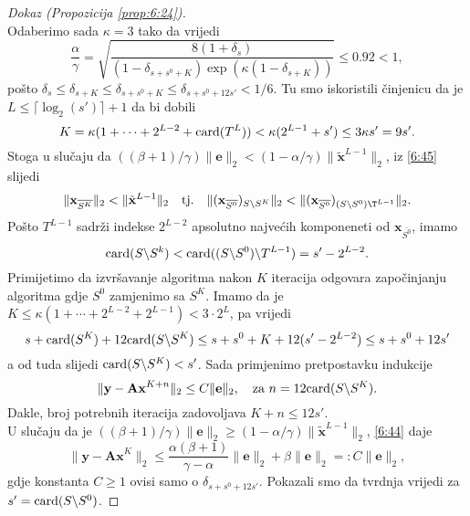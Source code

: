 \documentclass[a4paper,twoside,12pt]{memoir} %
\newcommand{\vect}[1]{\mathbf{#1}}
\renewcommand{\vec}{\vect}
\newcommand{\card}{\text{\normalfont{card}}}
\newcommand{\norm}[1]{\|{#1}\|}
\begin{document}
\begin{proof}[Dokaz (Propozicija \ref{prop:6:24})]
\begin{equation}
    \end{equation}
    Odaberimo sada $\kappa = 3$ tako da vrijedi
    \begin{equation*}
        \frac{\alpha}{\gamma} = \sqrt{\frac{8(1+\delta_s)}{(1-\delta_{s+s^0+K}) \exp(\kappa(1-\delta_{s+K}))}}  \leq 0.92 < 1,
    \end{equation*}
    po\v{s}to $\delta_s \leq \delta_{s+K} \leq \delta_{s+s^0+K} \leq \delta_{s+s^0+12s'} < 1/6$. Tu smo iskoristili \v{c}injenicu da je $L \leq \lceil \log_2(s') \rceil + 1$ da bi dobili
    \begin{equation*}
        K = \kappa(1+\cdots+2^{L-2} + \card(T^L)) < \kappa(2^{L-1}+s')\leq 3 \kappa s' = 9 s'.
    \end{equation*}
    Stoga u slu\v{c}aju da $((\beta+1)/\gamma)\norm{\vec e}_2 < (1- \alpha/\gamma) \norm{\tilde{\vec x}^{L-1}}_2$, iz \eqref{6:45} slijedi
    \begin{equation*}
        \norm{\vec x_{\overline{S^K}}}_2 < \norm{\tilde{\vec x}^{L-1}}_2 \quad \text{tj.} \quad \norm{(\vec x_{\overline{S^0}})_{S \backslash S^K}}_2 < \norm{(\vec x_{\overline{S^0}})_{(S \backslash S^0)\T^{L-1}}}_2.
    \end{equation*}
    Po\v{s}to $T^{L-1}$ sadr\v{z}i indekse $2^{L-2}$ apsolutno najve\'cih komponeneti od $\vec x_{\overline{S^0}}$, imamo
    \begin{equation*}
    \card(S \backslash S^k)< \card((S \backslash S^0) \backslash T^{L-1}) = s' - 2^{L-2}.
    \end{equation*}
    Primijetimo da izvr\v{s}avanje algoritma nakon $K$ iteracija odgovara zapo\v{c}injanju algoritma gdje $S^0$ zamjenimo sa $S^K$. Imamo da je $K \leq \kappa (1+\cdots+2^{L-2}+2^{L-1}) < 3 \cdot 2^L$, pa vrijedi
    \begin{equation*}
        s + \card(S^K)+12 \card(S \backslash S^K) \leq s + s^0 + K + 12(s' - 2^{L-2}) \leq s+ s^0 + 12s'
    \end{equation*}
    a od tuda slijedi $\card(S \backslash S^K) < s'$. Sada primjenimo pretpostavku indukcije
    \begin{equation*}
        \norm{\vec y - \vec{Ax}^{K+n}}_2 \leq C \norm{\vec e}_2, \quad \text{za } n=12\card(S \backslash S^K).
    \end{equation*}
    Dakle, broj potrebnih iteracija zadovoljava $K+n \leq 12s'$.\\
    U slu\v{c}aju da je $((\beta + 1)/\gamma)\norm{\vec e}_2 \geq (1-\alpha/\gamma)\norm{\tilde{\vec x}^{L-1}}_2$, \eqref{6:44} daje
    \begin{equation*}
        \norm{\vec y - \vec{Ax}^K}_2 \leq \frac{\alpha(\beta+1)}{\gamma - \alpha} \norm{\vec e}_2 + \beta \norm{\vec e}_2 =: C \norm{\vec e}_2,
    \end{equation*}
    gdje konstanta $C \geq 1$ ovisi samo o $\delta_{s+s^0+12s'}$. Pokazali smo da tvrdnja vrijedi za $s' = \card(S \backslash S^0)$.
\end{proof}
\end{document}
